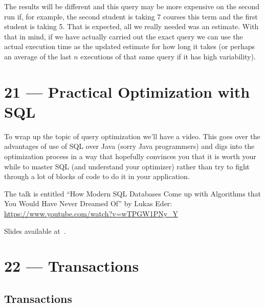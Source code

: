 \documentclass[a4paper]{report}
\begin{document}
The results will be different and this query may be more expensive on the second run if, for example, the second student is taking 7 courses this term and the first student is taking 5. That is expected, all we really needed was an estimate. With that in mind, if we have actually carried out the exact query we can use the actual execution time as the updated estimate for how long it takes (or perhaps an average of the last $n$ executions of that same query if it has high variability). 










\chapter*{21 --- Practical Optimization with SQL}


To wrap up the topic of query optimization we'll have a video. This goes over the advantages of use of SQL over Java (sorry Java programmers) and digs into the optimization process in a way that hopefully convinces you that it is worth your while to master SQL (and understand your optimizer) rather than try to fight through a lot of blocks of code to do it in your application.

The talk is entitled ``How Modern SQL Databases Come up with Algorithms that You Would Have Never Dreamed Of'' by Lukas Eder: \url{https://www.youtube.com/watch?v=wTPGW1PNy_Y}

Slides available at~\cite{lukaseder}.









\chapter*{22 --- Transactions}


\section*{Transactions} 
\end{document}

